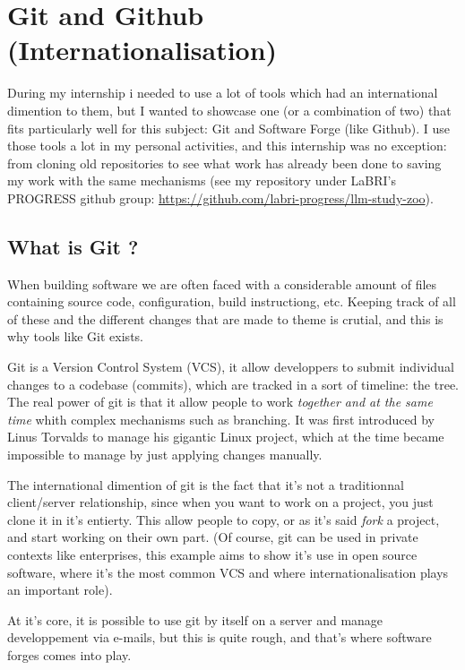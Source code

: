 \chapter{Git and Github (Internationalisation)}
\label{international}

During my internship i needed to use a lot of tools which had an international dimention to them, but I wanted to showcase one (or a combination of two) that fits particularly well for this subject:
Git and Software Forge (like Github).
I use those tools a lot in my personal activities, and this internship was no exception: from cloning old repositories to see what work has already been done to
saving my work with the same mechanisms (see my repository under LaBRI's PROGRESS github group: \url{https://github.com/labri-progress/llm-study-zoo}).


\section{What is Git ?}

When building software we are often faced with a considerable amount of files containing source code, configuration, build instructiong, etc.
Keeping track of all of these and the different changes that are made to theme is crutial, and this is why tools like Git exists.

Git is a Version Control System (VCS), it allow developpers to submit individual changes to a codebase (commits), which are tracked in a sort of timeline: the tree.
The real power of git is that it allow people to work \emph{together and at the same time} whith complex mechanisms such as branching.
It was first introduced by Linus Torvalds to manage his gigantic Linux project, which at the time became impossible to manage by just applying changes manually.

The international dimention of git is the fact that it's not a traditionnal client/server relationship, since when you want to work on a project, you just clone it in it's entierty.
This allow people to copy, or as it's said \emph{fork} a project, and start working on their own part.
(Of course, git can be used in private contexts like enterprises, this example aims to show it's use in open source software, where it's the most common VCS and where internationalisation plays an important role).

At it's core, it is possible to use git by itself on a server and manage developpement via e-mails, but this is quite rough, and that's where software forges comes into play.



